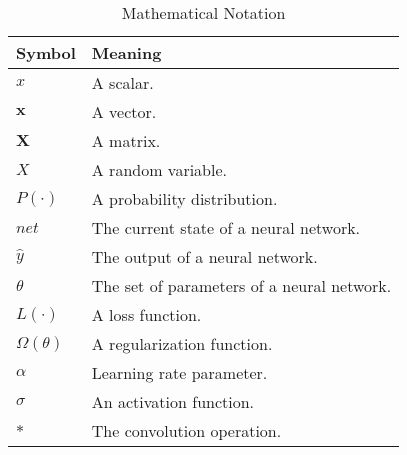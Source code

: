 \documentclass[../main.tex]{subfiles}
\begin{document}
    \begin{table}[!ht]
        \centering
        \caption{Mathematical Notation}
        \begin{tabulary}{\textwidth}{| L | L |}
            \toprule
            Symbol              &    Meaning                                 \\
            \midrule
            $x$                 & A scalar.                                  \\
            $\boldsymbol{x}$    & A vector.                                  \\
            $\boldsymbol{X}$    & A matrix.                                  \\
            $X$                 & A random variable.                         \\
            $P(\cdot)$          & A probability distribution.                \\
            $net$               & The current state of a neural network.     \\
            $\hat{y}$           & The output of a neural network.            \\
            $\theta$            & The set of parameters of a neural network. \\
            $L(\cdot)$          & A loss function.                           \\
            $\Omega(\theta)$    & A regularization function.                 \\
            $\alpha$            & Learning rate parameter.                   \\
            $\sigma$            & An activation function.                    \\
            $*$                 & The convolution operation.                 \\
            \bottomrule
        \end{tabulary}
    \end{table}
\end{document}
